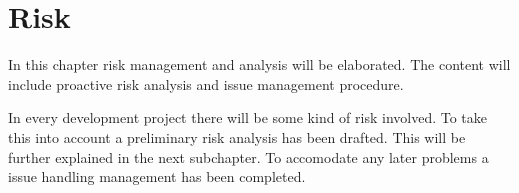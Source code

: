 \chapter{Risk}
In this chapter risk management and analysis will be elaborated. The content will include proactive risk analysis and issue management procedure. 

In every development project there will be some kind of risk involved. To take this into account a preliminary risk analysis has been drafted. This will be further explained in the next subchapter. To accomodate any later problems a issue handling management has been completed. 

%
%